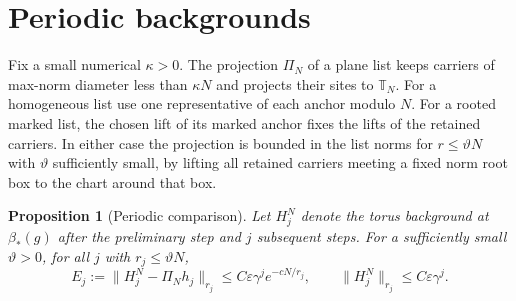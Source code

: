 \documentclass[11pt]{article}
\newtheorem{proposition}{Proposition}[section]
\theoremstyle{definition}
\begin{document}
\section{Periodic backgrounds}
\label{sec:periodic}

Fix a small numerical \(\kappa>0\). The projection \(\Pi_N\)
of a plane list keeps carriers of max-norm diameter less than
\(\kappa N\) and projects their sites to \(\mathbb T_N\).
For a homogeneous list use one representative of each anchor
modulo \(N\). For a rooted marked list, the chosen lift of its marked
anchor fixes the lifts of the retained carriers. In either case the
projection is bounded in the list norms for \(r\le\vartheta N\)
with \(\vartheta\) sufficiently small, by lifting all retained
carriers meeting a fixed norm root box to the chart around that box.

\begin{proposition}[Periodic comparison]\label{prop:periodic}
Let \(H_j^N\) denote the torus background at \(\beta_*(g)\) after
the preliminary step and \(j\) subsequent steps. For a sufficiently
small \(\vartheta>0\), for all \(j\) with \(r_j\le\vartheta N\),
\begin{equation}
 E_j:=\|H_j^N-\Pi_Nh_j\|_{r_j}
 \le C\varepsilon\gamma^j e^{-cN/r_j},\qquad
 \|H_j^N\|_{r_j}\le C\varepsilon\gamma^j.
 \label{eq:periodic-background}
\end{equation}
\end{proposition}
\end{document}
